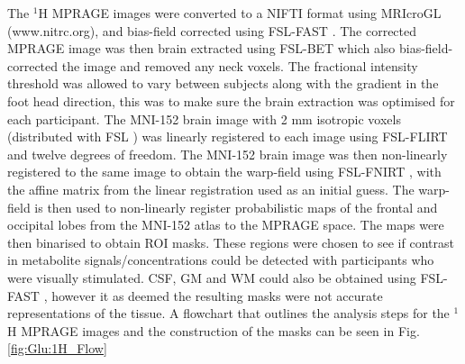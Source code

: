 The $^1$H \ac{MPRAGE} images were converted to a NIFTI format using MRIcroGL (www.nitrc.org), and bias-field corrected using FSL-FAST \cite{Zhang2001SegmentationAlgorithm}. The corrected \ac{MPRAGE} image was then brain extracted using FSL-BET \cite{Smith2002FastExtraction} which also bias-field-corrected the image and removed any neck voxels. The fractional intensity threshold was allowed to vary between subjects along with the gradient in the foot head direction, this was to make sure the brain extraction was optimised for each participant. The MNI-152 brain image with 2 mm isotropic voxels (distributed with FSL \cite{Smith2004AdvancesFSL}) was linearly registered to each image using FSL-FLIRT \cite{Jenkinson2001AImages, Jenkinson2002ImprovedImages} and twelve degrees of freedom. The MNI-152 brain image was then non-linearly registered to the same image to obtain the warp-field using FSL-FNIRT \cite{AnderssonJ2008FNIRT-FMRIBsTool}, with the affine matrix from the linear registration used as an initial guess. The warp-field is then used to non-linearly register probabilistic maps of the frontal and occipital lobes from the MNI-152 atlas to the \ac{MPRAGE} space. The maps were then binarised to obtain \ac{ROI} masks. These regions were chosen to see if contrast in metabolite signals/concentrations could be detected with participants who were visually stimulated. \ac{CSF}, \ac{GM} and \ac{WM} could also be obtained using FSL-FAST \cite{Zhang2001SegmentationAlgorithm}, however it as deemed the resulting masks were not accurate representations of the tissue. A flowchart that outlines the analysis steps for the $^1$H MPRAGE images and the construction of the masks can be seen in Fig. \ref{fig:Glu:1H_Flow}



